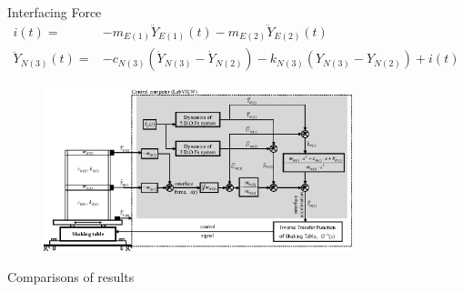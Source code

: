 \documentclass[usepdftitle=false]{beamer}
\begin{document}
\begin{frame}{Interfacing Force}
\begin{align}
i(t)=&-m_{E(1)}\ddot{Y}_{E(1)}(t)-m_{E(2)}\ddot{Y}_{E(2)}(t) \label{eq:2-19} \\
\ddot{Y}_{N(3)}(t)=&-c_{N(3)}\left(\dot{Y}_{N(3)}-\dot{Y}_{N(2)}\right) -k_{N(3)}\left(Y_{N(3)}-Y_{N(2)}\right)+i(t) \label{eq:2-20}
\end{align}

\begin{figure}[ht]
\centering
\includegraphics[width=0.8\textwidth] {figure/2-11.eps}
\end{figure}
\end{frame}


\begin{frame}{Comparisons of results}
\begin{figure}[ht]
\centering
\setcounter{subfigure}{0}
\label{fig:2-12}
\end{figure}
\end{frame}
\end{document}
